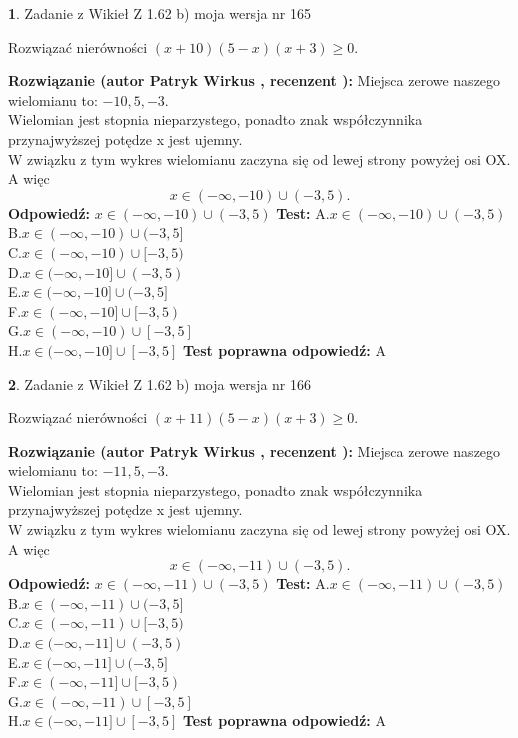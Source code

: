 \documentclass[12pt, a4paper]{article}
\theoremstyle{definition} %
\newtheorem{zad}{}
\newcommand{\zadStart}[1]{\begin{zad}#1\newline}
\newcommand{\zadStop}{\end{zad}}
\newcommand{\rozwStart}[2]{\noindent \textbf{Rozwiązanie (autor #1 , recenzent #2): }\newline}
\newcommand{\rozwStop}{\newline}
\newcommand{\odpStart}{\noindent \textbf{Odpowiedź:}\newline}
\newcommand{\odpStop}{\newline}
\newcommand{\testStart}{\noindent \textbf{Test:}\newline}
\newcommand{\testStop}{\newline}
\newcommand{\kluczStart}{\noindent \textbf{Test poprawna odpowiedź:}\newline}
\newcommand{\kluczStop}{\newline}
\begin{document}
\zadStart{Zadanie z Wikieł Z 1.62 b) moja wersja nr 165}

Rozwiązać nierówności $(x+10)(5-x)(x+3)\ge0$.
\zadStop
\rozwStart{Patryk Wirkus}{}
Miejsca zerowe naszego wielomianu to: $-10, 5, -3$.\\
Wielomian jest stopnia nieparzystego, ponadto znak współczynnika przy\linebreak najwyższej potędze x jest ujemny.\\ W związku z tym wykres wielomianu zaczyna się od lewej strony powyżej osi OX. A więc $$x \in (-\infty,-10) \cup (-3,5).$$
\rozwStop
\odpStart
$x \in (-\infty,-10) \cup (-3,5)$
\odpStop
\testStart
A.$x \in (-\infty,-10) \cup (-3,5)$\\
B.$x \in (-\infty,-10) \cup (-3,5]$\\
C.$x \in (-\infty,-10) \cup [-3,5)$\\
D.$x \in (-\infty,-10] \cup (-3,5)$\\
E.$x \in (-\infty,-10] \cup (-3,5]$\\
F.$x \in (-\infty,-10] \cup [-3,5)$\\
G.$x \in (-\infty,-10) \cup [-3,5]$\\
H.$x \in (-\infty,-10] \cup [-3,5]$
\testStop
\kluczStart
A
\kluczStop



\zadStart{Zadanie z Wikieł Z 1.62 b) moja wersja nr 166}

Rozwiązać nierówności $(x+11)(5-x)(x+3)\ge0$.
\zadStop
\rozwStart{Patryk Wirkus}{}
Miejsca zerowe naszego wielomianu to: $-11, 5, -3$.\\
Wielomian jest stopnia nieparzystego, ponadto znak współczynnika przy\linebreak najwyższej potędze x jest ujemny.\\ W związku z tym wykres wielomianu zaczyna się od lewej strony powyżej osi OX. A więc $$x \in (-\infty,-11) \cup (-3,5).$$
\rozwStop
\odpStart
$x \in (-\infty,-11) \cup (-3,5)$
\odpStop
\testStart
A.$x \in (-\infty,-11) \cup (-3,5)$\\
B.$x \in (-\infty,-11) \cup (-3,5]$\\
C.$x \in (-\infty,-11) \cup [-3,5)$\\
D.$x \in (-\infty,-11] \cup (-3,5)$\\
E.$x \in (-\infty,-11] \cup (-3,5]$\\
F.$x \in (-\infty,-11] \cup [-3,5)$\\
G.$x \in (-\infty,-11) \cup [-3,5]$\\
H.$x \in (-\infty,-11] \cup [-3,5]$
\testStop
\kluczStart
A
\kluczStop
\end{document}
